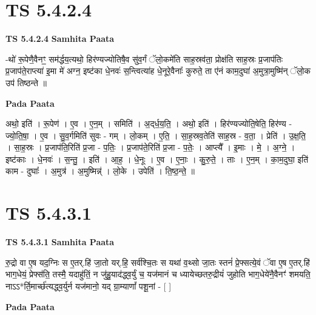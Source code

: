 \documentclass[17pt]{extarticle}
\begin{document}
\section*{ TS 5.4.2.4 }

\textbf{TS 5.4.2.4 } \newline
\textbf{Samhita Paata} \newline

-थो॑ रू॒पेणै॒वैनꣳ॒॒ सम॑र्द्धय॒त्यथो॒ हिर॑ण्यज्योतिषै॒व सु॑व॒र्गं ॅलो॒कमे॑ति साह॒स्रव॑ता॒ प्रोक्ष॑ति साह॒स्रः प्र॒जाप॑तिः प्र॒जाप॑ते॒राप्त्या॑ इ॒मा मे॑ अग्न॒ इष्ट॑का धे॒नवः॑ स॒न्त्वित्या॑ह धे॒नूरे॒वैनाः᳚ कुरुते॒ ता ए॑नं काम॒दुघा॑ अ॒मुत्रा॒मुष्मि॑न् ॅलो॒क उप॑ तिष्ठन्ते ॥ \newline

\textbf{Pada Paata} \newline

अथो॒ इति॑ । रू॒पेण॑ । ए॒व । ए॒न॒म् । समिति॑ । अ॒द्‌र्ध॒य॒ति॒ । अथो॒ इति॑ । हिर॑ण्यज्योति॒षेति॒ हिर॑ण्य - ज्यो॒ति॒षा॒ । ए॒व । सु॒व॒र्गमिति॑ सुवः - गम् । लो॒कम् । ए॒ति॒ । सा॒ह॒स्रव॒तेति॑ साह॒स्र - व॒ता॒ । प्रेति॑ । उ॒क्ष॒ति॒ । सा॒ह॒स्रः । प्र॒जाप॑ति॒रिति॑ प्र॒जा - प॒तिः॒ । प्र॒जाप॑ते॒रिति॑ प्र॒जा - प॒तेः॒ । आप्त्यै᳚ । इ॒माः । मे॒ । अ॒ग्ने॒ । इष्ट॑काः । धे॒नवः॑ । स॒न्तु॒ । इति॑ । आ॒ह॒ । धे॒नूः । ए॒व । ए॒नाः॒ । कु॒रु॒ते॒ । ताः । ए॒न॒म् । का॒म॒दुघा॒ इति॑ काम - दुघाः᳚ । अ॒मुत्र॑ । अ॒मुष्मिन्न्॑ । लो॒के । उपेति॑ । ति॒ष्ठ॒न्ते॒ ॥  \newline




\section*{ TS 5.4.3.1 }

\textbf{TS 5.4.3.1 } \newline
\textbf{Samhita Paata} \newline

रु॒द्रो वा ए॒ष यद॒ग्निः स ए॒तर्.हि॑ जा॒तो यर्.हि॒ सर्व॑श्चि॒तः स यथा॑ व॒थ्सो जा॒तः स्तनं॑ प्रे॒फ्सत्ये॒वं ॅवा ए॒ष ए॒तर्.हि॑ भाग॒धेयं॒ प्रेफ्स॑ति॒ तस्मै॒ यदाहु॑तिं॒ न जु॑हु॒याद॑द्ध्व॒र्युं च॒ यज॑मानं च ध्यायेच्छतरु॒द्रीयं॑ जुहोति भाग॒धेये॑नै॒वैनꣳ॑ शमयति॒ नाऽऽ*र्ति॒मार्च्छ॑त्यद्ध्व॒र्युर्न यज॑मानो॒ यद् ग्रा॒म्याणां᳚ पशू॒नां - [  ] \newline

\textbf{Pada Paata} \newline
\end{document}
